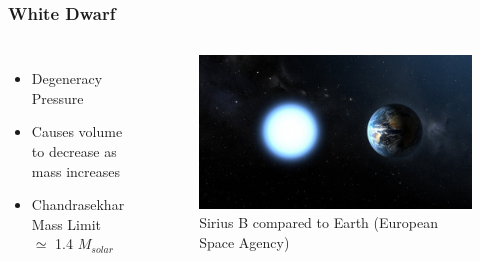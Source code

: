 \documentclass{beamer}
\begin{document}

\begin{frame}
\frametitle{White Dwarf}

\begin{columns}[c]
        \begin{itemize}
                \item Degeneracy Pressure
		\item Causes volume to decrease as mass increases
		\item Chandrasekhar Mass Limit \\ $\simeq$ 1.4 $M_{solar}$
        \end{itemize}


        \begin{figure}
    \begin{center}
      \includegraphics[width=.90\linewidth]{white_dwarf.jpeg}
	    \caption{Sirius B compared to Earth (European Space Agency)}
    \end{center}
  \end{figure}

        \end{columns}

\end{frame}



\end{document}
